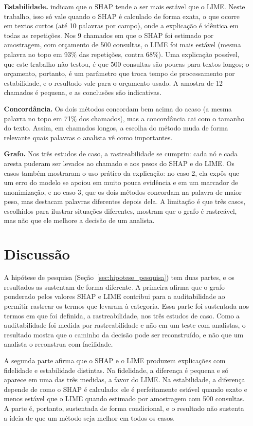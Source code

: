 \documentclass[
    12pt,                %
    openright,           %
    oneside,             %
    a4paper,             %
    english,             %
    brazil               %
]{abntex2}
\begin{document}
\textbf{Estabilidade.}  indicam que o SHAP tende a ser mais estável que o LIME. Neste trabalho, isso só vale quando o SHAP é calculado de forma exata, o que ocorre em textos curtos (até 10 palavras por campo), onde a explicação é idêntica em todas as repetições. Nos 9 chamados em que o SHAP foi estimado por amostragem, com orçamento de 500 consultas, o LIME foi mais estável (mesma palavra no topo em 93\% das repetições, contra 68\%). Uma explicação possível, que este trabalho não testou, é que 500 consultas são poucas para textos longos; o orçamento, portanto, é um parâmetro que troca tempo de processamento por estabilidade, e o resultado vale para o orçamento usado. A amostra de 12 chamados é pequena, e as conclusões são indicativas.
 
\textbf{Concordância.} Os dois métodos concordam bem acima do acaso (a mesma palavra no topo em 71\% dos chamados), mas a concordância cai com o tamanho do texto. Assim, em chamados longos, a escolha do método muda de forma relevante quais palavras o analista vê como importantes.
 
\textbf{Grafo.} Nos três estudos de caso, a rastreabilidade se cumpriu: cada nó e cada aresta puderam ser levados ao chamado e aos pesos do SHAP e do LIME. Os casos também mostraram o uso prático da explicação: no caso 2, ela expôs que um erro do modelo se apoiou em muito pouca evidência e em um marcador de anonimização, e no caso 3, que os dois métodos concordam na palavra de maior peso, mas destacam palavras diferentes depois dela. A limitação é que três casos, escolhidos para ilustrar situações diferentes, mostram que o grafo é rastreável, mas não que ele melhore a decisão de um analista.

\section{Discussão}
A hipótese de pesquisa (Seção~\ref{sec:hipotese_pesquisa}) tem duas partes, e os resultados as sustentam de forma diferente. A primeira afirma que o grafo ponderado pelos valores SHAP e LIME contribui para a auditabilidade ao permitir rastrear os termos que levaram à categoria. Essa parte foi sustentada nos termos em que foi definida, a rastreabilidade, nos três estudos de caso. Como a auditabilidade foi medida por rastreabilidade e não em um teste com analistas, o resultado mostra que o caminho da decisão pode ser reconstruído, e não que um analista o reconstrua com facilidade.
 
A segunda parte afirma que o SHAP e o LIME produzem explicações com fidelidade e estabilidade distintas. Na fidelidade, a diferença é pequena e só aparece em uma das três medidas, a favor do LIME. Na estabilidade, a diferença depende de como o SHAP é calculado: ele é perfeitamente estável quando exato e menos estável que o LIME quando estimado por amostragem com 500 consultas. A parte é, portanto, sustentada de forma condicional, e o resultado não sustenta a ideia de que um método seja melhor em todos os casos.
 
\end{document}
